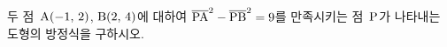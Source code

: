 두 점~$\mathrm{A}(-1,\,2)$, $\mathrm{B}(2,\,4)$에 대하여 $\overline{\mathrm{PA}}^2-\overline{\mathrm{PB}}^2=9$를 만족시키는 점~$\mathrm{P}$가 나타내는 도형의 방정식을 구하시오.
